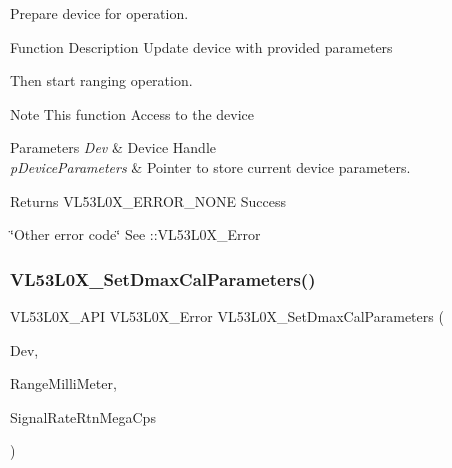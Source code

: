Prepare device for operation. 

\begin{DoxyParagraph}{Function Description}
Update device with provided parameters \begin{DoxyItemize}
\item Then start ranging operation.\end{DoxyItemize}

\end{DoxyParagraph}
\begin{DoxyNote}{Note}
This function Access to the device
\end{DoxyNote}

\begin{DoxyParams}{Parameters}
{\em Dev} & Device Handle \\
\hline
{\em p\+Device\+Parameters} & Pointer to store current device parameters. \\
\hline
\end{DoxyParams}
\begin{DoxyReturn}{Returns}
V\+L53\+L0\+X\+\_\+\+E\+R\+R\+O\+R\+\_\+\+N\+O\+NE Success 

\char`\"{}\+Other error code\char`\"{} See \+::\+V\+L53\+L0\+X\+\_\+\+Error 
\end{DoxyReturn}
\mbox{\label{group__VL53L0X__parameters__group_ga3cf3ba12ba6b6db8ac0cfc6e756b87c1}} 
\subsubsection{\texorpdfstring{V\+L53\+L0\+X\+\_\+\+Set\+Dmax\+Cal\+Parameters()}{VL53L0X\_SetDmaxCalParameters()}}
{\footnotesize\ttfamily V\+L53\+L0\+X\+\_\+\+A\+PI V\+L53\+L0\+X\+\_\+\+Error V\+L53\+L0\+X\+\_\+\+Set\+Dmax\+Cal\+Parameters (\begin{DoxyParamCaption}\item[{\hyperlink{group__VL53L0X__platform__group_ga2d6405308b1dd524b462f1b8fb97d167}{V\+L53\+L0\+X\+\_\+\+D\+EV}}]{Dev,  }\item[{\hyperlink{vl53l0x__types_8h_a273cf69d639a59973b6019625df33e30}{uint16\+\_\+t}}]{Range\+Milli\+Meter,  }\item[{\hyperlink{vl53l0x__types_8h_afb910790161809fc76e1a274a6349384}{Fix\+Point1616\+\_\+t}}]{Signal\+Rate\+Rtn\+Mega\+Cps }\end{DoxyParamCaption})}



